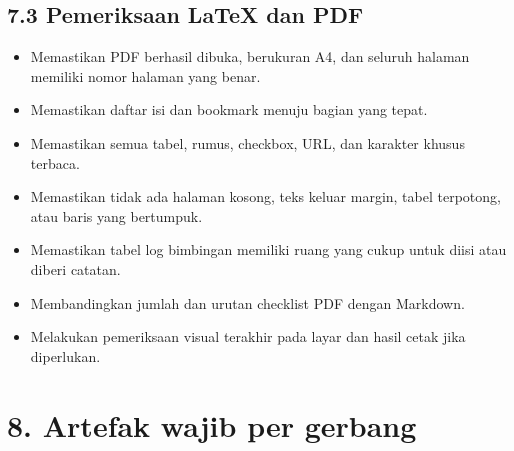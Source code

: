 \documentclass[
  indonesian,
  11pt,
]{article}
\providecommand{\tightlist}{%
  \setlength{\itemsep}{0pt}\setlength{\parskip}{0pt}}
\renewcommand{\tightlist}{%
  \setlength{\itemsep}{0.22em}%
  \setlength{\parskip}{0pt}%
}
\begin{document}
\subsection{7.3 Pemeriksaan LaTeX dan
PDF}\label{pemeriksaan-latex-dan-pdf}

\begin{itemize}
\tightlist
\item[$\square$]
  Memastikan PDF berhasil dibuka, berukuran A4, dan seluruh halaman
  memiliki nomor halaman yang benar.
\item[$\square$]
  Memastikan daftar isi dan bookmark menuju bagian yang tepat.
\item[$\square$]
  Memastikan semua tabel, rumus, checkbox, URL, dan karakter khusus
  terbaca.
\item[$\square$]
  Memastikan tidak ada halaman kosong, teks keluar margin, tabel
  terpotong, atau baris yang bertumpuk.
\item[$\square$]
  Memastikan tabel log bimbingan memiliki ruang yang cukup untuk diisi
  atau diberi catatan.
\item[$\square$]
  Membandingkan jumlah dan urutan checklist PDF dengan Markdown.
\item[$\square$]
  Melakukan pemeriksaan visual terakhir pada layar dan hasil cetak jika
  diperlukan.
\end{itemize}

\section{8. Artefak wajib per gerbang}\label{artefak-wajib-per-gerbang}
\end{document}
